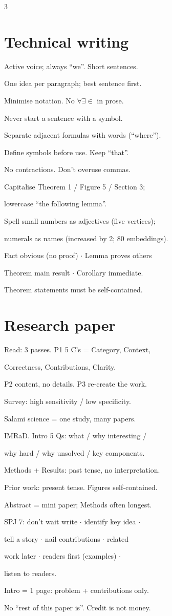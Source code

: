 \documentclass[a4paper]{article}
\begin{document}
{\begin{multicols}{3}
\section{Technical writing}
Active voice; always ``we''. Short sentences.\par
One idea per paragraph; best sentence first.\par
Minimise notation. No $\forall \exists \in$ in prose.\par
Never start a sentence with a symbol.\par
Separate adjacent formulas with words (``where'').\par
Define symbols before use. Keep ``that''.\par
No contractions. Don't overuse commas.\par
Capitalise Theorem 1 / Figure 5 / Section 3;\par
\quad lowercase ``the following lemma''.\par
Spell small numbers as adjectives (five vertices);\par
\quad numerals as names (increased by 2; 80 embeddings).\par
Fact obvious (no proof) $\cdot$ Lemma proves others\par
Theorem main result $\cdot$ Corollary immediate.\par
Theorem statements must be self-contained.

\section{Research paper}
Read: 3 passes. P1 5 C's = Category, Context,\par
\quad Correctness, Contributions, Clarity.\par
P2 content, no details. P3 re-create the work.\par
Survey: high sensitivity / low specificity.\par
Salami science = one study, many papers.\par
IMRaD. Intro 5 Qs: what / why interesting /\par
\quad why hard / why unsolved / key components.\par
Methods + Results: past tense, no interpretation.\par
Prior work: present tense. Figures self-contained.\par
Abstract = mini paper; Methods often longest.\par
SPJ 7: don't wait write $\cdot$ identify key idea $\cdot$\par
\quad tell a story $\cdot$ nail contributions $\cdot$ related\par
\quad work later $\cdot$ readers first (examples) $\cdot$\par
\quad listen to readers.\par
Intro = 1 page: problem + contributions only.\par
No ``rest of this paper is''. Credit is not money.

\end{multicols}}
\end{document}
